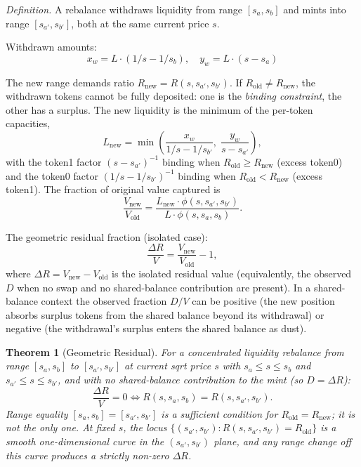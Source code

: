 \documentclass[11pt,a4paper]{article}
\newtheorem{theorem}{Theorem}
\begin{document}
\emph{Definition.} A rebalance withdraws liquidity from range $[s_a, s_b]$ and mints into range $[s_{a'}, s_{b'}]$, both at the same current price $s$.

Withdrawn amounts:
\begin{equation}\label{eq:withdrawn}
x_w = L \cdot (1/s - 1/s_b), \quad y_w = L \cdot (s - s_a)
\end{equation}

The new range demands ratio $R_{\text{new}} = R(s, s_{a'}, s_{b'})$. If $R_{\text{old}} \neq R_{\text{new}}$, the withdrawn tokens cannot be fully deposited: one is the \emph{binding constraint}, the other has a surplus. The new liquidity is the minimum of the per-token capacities,
\begin{equation}\label{eq:cases}
L_{\text{new}} = \min\!\left(\frac{x_w}{1/s - 1/s_{b'}}, \; \frac{y_w}{s - s_{a'}}\right),
\end{equation}
with the token1 factor $(s - s_{a'})^{-1}$ binding when $R_{\text{old}} \geq R_{\text{new}}$ (excess token0) and the token0 factor $(1/s - 1/s_{b'})^{-1}$ binding when $R_{\text{old}} < R_{\text{new}}$ (excess token1). The fraction of original value captured is
\begin{equation}\label{eq:cases-value}
\frac{V_{\text{new}}}{V_{\text{old}}} = \frac{L_{\text{new}} \cdot \phi(s, s_{a'}, s_{b'})}{L \cdot \phi(s, s_a, s_b)}.
\end{equation}

The geometric residual fraction (isolated case):
\begin{equation}\label{eq:dv}
\frac{\Delta R}{V} = \frac{V_{\text{new}}}{V_{\text{old}}} - 1,
\end{equation}
where $\Delta R = V_{\text{new}} - V_{\text{old}}$ is the isolated residual value (equivalently, the observed $D$ when no swap and no shared-balance contribution are present). In a shared-balance context the observed fraction $D/V$ can be positive (the new position absorbs surplus tokens from the shared balance beyond its withdrawal) or negative (the withdrawal's surplus enters the shared balance as dust).

\begin{theorem}[Geometric Residual]\label{thm:residual}
For a concentrated liquidity rebalance from range $[s_a, s_b]$ to $[s_{a'}, s_{b'}]$ at current sqrt price $s$ with $s_a \leq s \leq s_b$ and $s_{a'} \leq s \leq s_{b'}$, and with no shared-balance contribution to the mint (so $D = \Delta R$):
\[
\frac{\Delta R}{V} = 0 \iff R(s, s_a, s_b) = R(s, s_{a'}, s_{b'}).
\]
Range equality $[s_a, s_b] = [s_{a'}, s_{b'}]$ is a sufficient condition for $R_{\text{old}} = R_{\text{new}}$; it is not the only one. At fixed $s$, the locus $\{(s_{a'}, s_{b'}) : R(s, s_{a'}, s_{b'}) = R_{\text{old}}\}$ is a smooth one-dimensional curve in the $(s_{a'}, s_{b'})$ plane, and any range change off this curve produces a strictly non-zero $\Delta R$.
\end{theorem}
\end{document}
